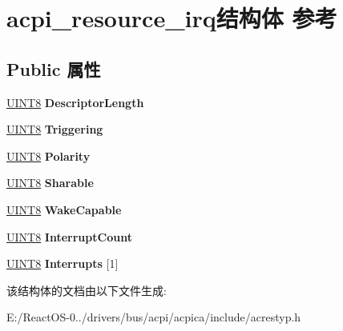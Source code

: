 \hypertarget{structacpi__resource__irq}{}\section{acpi\+\_\+resource\+\_\+irq结构体 参考}
\label{structacpi__resource__irq}
\subsection*{Public 属性}
\begin{DoxyCompactItemize}
\item 
\mbox{\label{structacpi__resource__irq_a0283b111661980b61da30b69582dfe6f}} 
\hyperlink{_processor_bind_8h_ab27e9918b538ce9d8ca692479b375b6a}{U\+I\+N\+T8} {\bfseries Descriptor\+Length}
\item 
\mbox{\label{structacpi__resource__irq_ae5acbe07f08ae2ebd6de76fda22ed6f0}} 
\hyperlink{_processor_bind_8h_ab27e9918b538ce9d8ca692479b375b6a}{U\+I\+N\+T8} {\bfseries Triggering}
\item 
\mbox{\label{structacpi__resource__irq_aead99c29a14bab4b161bbdcd7c2c3a26}} 
\hyperlink{_processor_bind_8h_ab27e9918b538ce9d8ca692479b375b6a}{U\+I\+N\+T8} {\bfseries Polarity}
\item 
\mbox{\label{structacpi__resource__irq_a3561538517deec83977cd644cab97502}} 
\hyperlink{_processor_bind_8h_ab27e9918b538ce9d8ca692479b375b6a}{U\+I\+N\+T8} {\bfseries Sharable}
\item 
\mbox{\label{structacpi__resource__irq_a9c581d55e6c7ca7716009422cdeff4c2}} 
\hyperlink{_processor_bind_8h_ab27e9918b538ce9d8ca692479b375b6a}{U\+I\+N\+T8} {\bfseries Wake\+Capable}
\item 
\mbox{\label{structacpi__resource__irq_aa40e841059c67df7a1605b4089c2d20e}} 
\hyperlink{_processor_bind_8h_ab27e9918b538ce9d8ca692479b375b6a}{U\+I\+N\+T8} {\bfseries Interrupt\+Count}
\item 
\mbox{\label{structacpi__resource__irq_a34f8732b3e0b28136b002130c734528c}} 
\hyperlink{_processor_bind_8h_ab27e9918b538ce9d8ca692479b375b6a}{U\+I\+N\+T8} {\bfseries Interrupts} \mbox{[}1\mbox{]}
\end{DoxyCompactItemize}


该结构体的文档由以下文件生成\+:\begin{DoxyCompactItemize}
\item 
E\+:/\+React\+O\+S-\/0../drivers/bus/acpi/acpica/include/acrestyp.\+h\end{DoxyCompactItemize}
